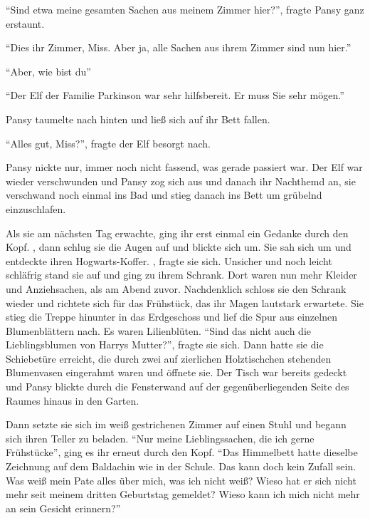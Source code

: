 \enquote{Sind etwa meine gesamten Sachen aus meinem Zimmer hier?}, fragte Pansy ganz erstaunt.

\enquote{Dies  ihr Zimmer, Miss. Aber ja, alle Sachen aus ihrem  Zimmer sind nun hier.}

\enquote{Aber, wie bist du\abs}

\enquote{Der Elf der Familie Parkinson war sehr hilfsbereit. Er muss Sie sehr mögen.}

Pansy taumelte nach hinten und ließ sich auf ihr Bett fallen.

\enquote{Alles gut, Miss?}, fragte der Elf besorgt nach.

Pansy nickte nur, immer noch nicht fassend, was gerade passiert war.  Der Elf war wieder verschwunden und Pansy zog sich aus und danach ihr Nachthemd an, sie verschwand noch einmal ins Bad und stieg danach ins Bett um grübelnd einzuschlafen.

Als sie am nächsten Tag erwachte, ging ihr erst einmal ein Gedanke durch den Kopf. , dann schlug sie die Augen auf und blickte sich um.  Sie sah sich um und entdeckte ihren Hogwarts-Koffer. , fragte sie sich. Unsicher und noch leicht schläfrig stand sie auf und ging zu ihrem Schrank. Dort waren nun mehr Kleider und Anziehsachen, als am Abend zuvor. Nachdenklich schloss sie den Schrank wieder und richtete sich für das Frühstück, das ihr Magen lautstark erwartete. Sie stieg die Treppe hinunter in das Erdgeschoss und lief die Spur aus einzelnen Blumenblättern nach. Es waren Lilienblüten. \enquote{Sind das nicht auch die Lieblingsblumen von Harrys Mutter?}, fragte sie sich. Dann hatte sie die Schiebetüre erreicht, die durch zwei auf zierlichen Holztischchen stehenden Blumenvasen eingerahmt waren und öffnete sie. Der Tisch war bereits gedeckt und Pansy blickte durch die Fensterwand auf der gegenüberliegenden Seite des Raumes hinaus in den Garten.

Dann setzte sie sich im weiß gestrichenen Zimmer auf einen Stuhl und begann sich ihren Teller zu beladen. \enquote{Nur meine Lieblingssachen, die ich gerne Frühstücke}, ging es ihr erneut durch den Kopf. \enquote{Das Himmelbett hatte dieselbe Zeichnung auf dem Baldachin wie in der Schule. Das kann doch kein Zufall sein. Was weiß mein Pate alles über mich, was ich nicht weiß? Wieso hat er sich nicht mehr seit meinem dritten Geburtstag gemeldet? Wieso kann ich mich nicht mehr an sein Gesicht erinnern?}

